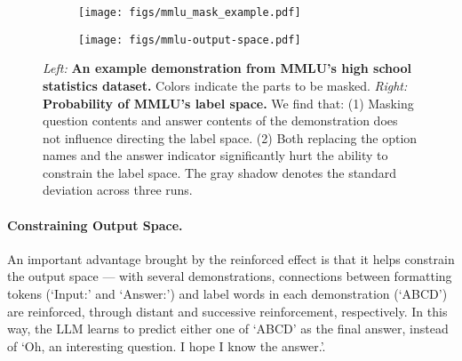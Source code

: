 \documentclass{article} %
\begin{document}
\begin{figure}[t]
  \centering
  
  \begin{subfigure}[b]{0.48\linewidth}
    \centering
    \texttt{[image: figs/mmlu\_mask\_example.pdf]}
  \end{subfigure}
  \hfill
  \begin{subfigure}[b]{0.48\linewidth}
    \centering
    \texttt{[image: figs/mmlu-output-space.pdf]}
  \end{subfigure}
  \caption{\emph{Left: }\textbf{An example demonstration from MMLU's high school statistics dataset.} Colors indicate the parts to be masked. \emph{Right: }\textbf{Probability of MMLU's label space. } We find that: (1) Masking question contents and answer contents of the demonstration does not influence directing the label space. (2) Both replacing the option names and the answer indicator significantly hurt the ability to constrain the label space. The gray shadow denotes the standard deviation across three runs. }
  \vspace{-10pt}
  \label{fig:mmlu}
\end{figure}


\paragraph*{Constraining Output Space.} 
An important advantage brought by the reinforced effect is that it helps constrain the output space --- with several demonstrations, connections between formatting tokens (`Input:' and `Answer:') and label words in each demonstration (`ABCD') are reinforced, through distant and successive reinforcement, respectively. In this way, the LLM learns to predict either one of `ABCD' as the final answer, instead of `Oh, an interesting question. I hope I know the answer.'.
\end{document}
